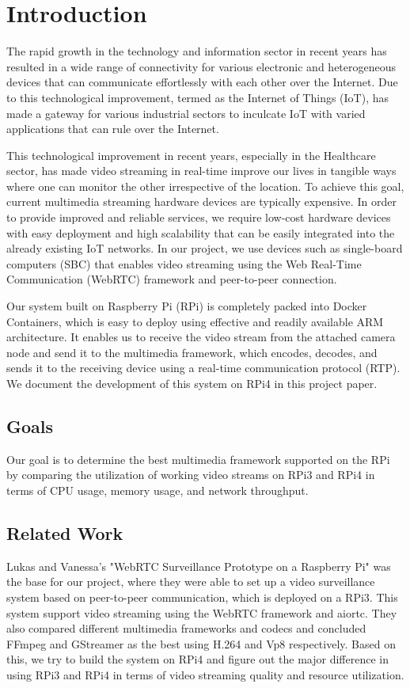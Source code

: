 \section{Introduction}
The rapid growth in the technology and information sector in recent years has resulted in a wide range of connectivity for various electronic and heterogeneous devices that can communicate effortlessly with each other over the Internet. Due to this technological improvement, termed as the Internet of Things (IoT), has made a gateway for various industrial sectors to inculcate IoT with varied applications that can rule over the Internet. \par

This technological improvement in recent years, especially in the Healthcare sector, has made video streaming in real-time improve our lives in tangible ways where one can monitor the other irrespective of the location. To achieve this goal, current multimedia streaming hardware devices are typically expensive. In order to provide improved and reliable services, we require low-cost hardware devices with easy deployment and high scalability that can be easily integrated into the already existing IoT networks. In our project, we use devices such as single-board computers (SBC) that enables video streaming using the Web Real-Time Communication (WebRTC) framework and peer-to-peer connection. \par

Our system built on Raspberry Pi (RPi) is completely packed into Docker Containers, which is easy to deploy using effective and readily available ARM architecture. It enables us to receive the video stream from the attached camera node and send it to the multimedia framework, which encodes, decodes, and sends it to the receiving device using a real-time communication protocol (RTP). We document the development of this system on RPi4 in this project paper.

\subsection{Goals} 
Our goal is to determine the best multimedia framework supported on the RPi by comparing the utilization of working video streams on RPi3 and RPi4 in terms of CPU usage, memory usage, and network throughput.

\subsection{Related Work}
Lukas and Vanessa’s \cite{lv} "WebRTC Surveillance Prototype on a Raspberry Pi" was the base for our project, where they were able to set up a video surveillance system based on peer-to-peer communication, which is deployed on a RPi3. This system support video streaming using the WebRTC framework and aiortc. They also compared different multimedia frameworks and codecs and concluded FFmpeg and GStreamer as the best using H.264 and Vp8 respectively. Based on this, we try to build the system on RPi4 and figure out the major difference in using RPi3 and RPi4 in terms of video streaming quality and resource utilization.
